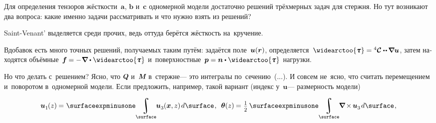 \begin{otherlanguage}{russian}

Для определения тензоров жёсткости~$\bm{a}$, $\bm{b}$ и~$\bm{c}$ одномерной модели достаточно решений трёхмерных задач для стержня.
Но тут возникают два вопроса: какие именно задачи рассматривать и что нужно взять из решений?

Saint\hbox{-\hspace{-0.2ex}}Venant’ выделяется среди прочих, ведь оттуда берётся жёсткость на~кручение.

Вдобавок есть много точных решений, получаемых таким путём: задаётся поле~${\bm{u}(\bm{r})}$, определяется~${\widearctoo{\cauchystress} = \stiffnesstensorC \dotdotp \hspace{-0.12ex} \boldnabla \bm{u}}$, затем находятся объёмные~${\bm{f} \hspace{-0.1ex} = - \hspace{.1ex} \boldnabla \dotp \widearctoo{\cauchystress}\hspace{.1ex}}$ и~поверхностные~${\bm{p} = \bm{n} \dotp \widearctoo{\cauchystress}\hspace{.1ex}}$ нагрузки.

Но что делать с~решением?
Ясно, что $\mathboldQ$ и~$\mathboldM$ в~стержне\:--- это интегралы по~сечению~(...).
И совсем не~ясно, что считать перемещением и~поворотом в~одномерной модели.
Если предложить, например, такой вариант (индекс у~$\bm{u}$\:--- размерность модели)

\nopagebreak\vspace{-0.1em}\begin{equation*}
\bm{u}_{\raisemath{-0.2ex}{1}}\hspace{-0.15ex}(z) \hspace{-0.1ex} = \hspace{.1ex} \surfaceexpminusone \hspace{-0.4ex} \integral\displaylimits_{\surface} \hspace{-0.5ex} \bm{u}_{\raisemath{-0.2ex}{3}}\hspace{-0.05ex}(\bm{x},z) \hspace{.25ex} d\surface
\hspace{.15ex} ,
\:\;
\bm{\theta}(z) \hspace{-0.1ex} = \hspace{.1ex} \smalldisplaystyleonehalf \hspace{.4ex} \surfaceexpminusone \hspace{-0.4ex} \integral\displaylimits_{\surface} \hspace{-0.5ex} \boldnabla \hspace{-0.15ex} \times \hspace{-0.15ex} \bm{u}_{\raisemath{-0.2ex}{3}} \hspace{.2ex} d\surface
\hspace{.15ex} ,
\end{equation*}


\end{otherlanguage}
